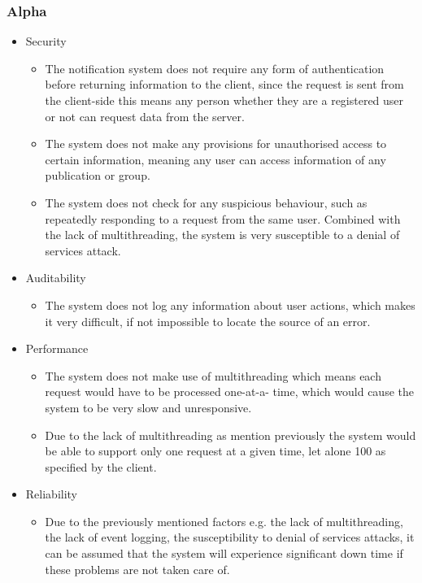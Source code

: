 \subsubsection{Alpha}
\begin{itemize}
	\item Security
		\begin{itemize}
			\item The notification system does not require any form of authentication before returning information to the 							client, since the request is sent from the client-side this means any person whether they are a registered user 					or not can request data from the server.
			\item The system does not make any provisions for unauthorised access to certain information, meaning any user can 						access information of any publication or group.
			\item The system does not check for any suspicious behaviour, such as repeatedly responding to a request from the 						same user. Combined with the lack of multithreading, the system is very susceptible to a denial of services 						attack.
		\end{itemize}
	\item Auditability
		\begin{itemize}
			\item The system does not log any information about user actions, which makes it very difficult, if not impossible 						to locate the source of an error.
		\end{itemize}
	\item Performance
		\begin{itemize}
			\item The system does not make use of multithreading which means each request would have to be processed one-at-a-						time, which would cause the system to be very slow and unresponsive.
			\item Due to the lack of multithreading as mention previously the system would be able to support only one request 						at a given time, let alone 100 as specified by the client.
		\end{itemize}
	\item Reliability
		\begin{itemize}
			\item Due to the previously mentioned factors e.g. the lack of multithreading, the lack of event logging, the 							susceptibility to denial of services attacks, it can be assumed that the system will experience significant down 				time if these problems are not taken care of.

\end{itemize}
\end{itemize}
